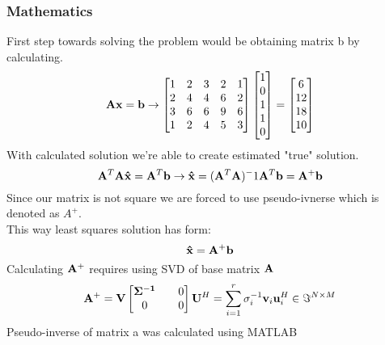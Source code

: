 \subsubsection*{Mathematics}
First step towards solving the problem would be obtaining matrix b by calculating.
\begin{equation*}
    \mathbf{A}\mathbf{x} = \mathbf{b} \rightarrow 
    \begin{bmatrix}
        1 & 2 & 3 & 2 & 1 \\
        2 & 4 & 4 & 6 & 2 \\
        3 & 6 & 6 & 9 & 6 \\
        1 & 2 & 4 & 5 & 3
    \end{bmatrix}
    \begin{bmatrix}
        1 \\
        0 \\
        1 \\
        1 \\
        0
    \end{bmatrix} =
    \begin{bmatrix}
        6 \\
        12 \\
        18 \\
        10
\end{bmatrix}
\end{equation*}
With calculated solution we're able to create estimated "true" solution.
\begin{equation*}
    \mathbf{A}^T\mathbf{A}\mathbf{\hat{x}} = \mathbf{A}^T\mathbf{b} \rightarrow
    \mathbf{\hat{x}} = (\mathbf{A}^T\mathbf{A})^-1 \mathbf{A}^T\mathbf{b} = \mathbf{A}^+\mathbf{b}
\end{equation*}
Since our matrix is not square we are forced to use pseudo-ivnerse which is denoted as $A^+$.\\
This way least squares solution has form:
\begin{equation*}
    \mathbf{\hat{x}} = \mathbf{A}^+ \mathbf{b}
\end{equation*}
Calculating $\mathbf{A^+}$ requires using SVD of base matrix $\mathbf{\mathbf{A}}$
\begin{equation*}
    \mathbf{A^+} = \mathbf{V} 
    \begin{bmatrix}
        \mathbf{\Sigma^{-1}} && 0 \\
        0 && 0
    \end{bmatrix}
    \mathbf{U}^H = \sum_{i=1}^{r} \sigma_i^{-1} \mathbf{v}_i\mathbf{u}_i^H \in \mathbf{\Im}^{N \times M} 
\end{equation*}
Pseudo-inverse of matrix a was calculated using MATLAB

